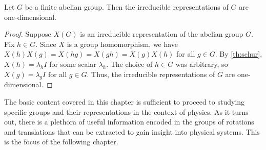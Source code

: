 
\begin{theorem}\label{cor:abelian_irred}
    Let $G$ be a finite abelian group. Then the irreducible representations of $G$ are one-dimensional.
\end{theorem}
\begin{proof}
    Suppose $X(G)$ is an irreducible representation of the abelian group $G$. Fix $h\in G$. Since $X$ is a group homomorphism, we have $X(h)X(g)=X(hg)=X(gh)=X(g)X(h)$ for all $g\in G$. By \cref{th:schur}, $X(h) = \lambda_h I$ for some scalar $\lambda_h$. The choice of $h\in G$ was arbitrary, so $X(g) = \lambda_g I$ for all $g\in G$. Thus, the irreducible representations of $G$ are one-dimensional.
\end{proof}
The basic content covered in this chapter is sufficient to proceed to studying specific groups and their representations in the context of physics. As it turns out, there is a plethora of useful information encoded in the groups of rotations and translations that can be extracted to gain insight into physical systems. This is the focus of the following chapter.